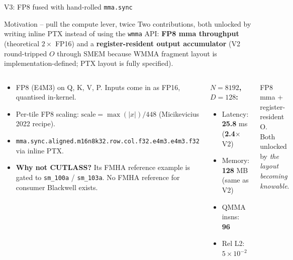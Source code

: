 \documentclass[10pt,aspectratio=169]{beamer}
\begin{document}
\begin{frame}{V3: FP8 fused with hand-rolled \texttt{mma.sync}}
  \begin{block}{Motivation -- pull the compute lever, twice}
    Two contributions, both unlocked by writing inline PTX instead of
    using the \texttt{wmma} API: \textbf{FP8 mma throughput} (theoretical
    $2\times$ FP16) and a \textbf{register-resident output accumulator}
    (V2 round-tripped $O$ through SMEM because WMMA fragment layout is
    implementation-defined; PTX layout is fully specified).
  \end{block}
  \begin{columns}[T]
      \begin{whatif}
        \begin{itemize}
          \item FP8 (E4M3) on Q, K, V, P. Inputs come in as FP16,
                quantised in-kernel.
          \item Per-tile FP8 scaling: $\mathrm{scale} = \max(|x|)/448$
                (Micikevicius 2022 recipe).
          \item \texttt{mma.sync.aligned.m16n8k32.row.col.f32.e4m3.e4m3.f32}
                via inline PTX.
          \item \textbf{Why not CUTLASS?} Its FMHA reference example is
                gated to \texttt{sm\_100a} / \texttt{sm\_103a}. No FMHA
                reference for consumer Blackwell exists.
        \end{itemize}
      \end{whatif}
      \begin{numbers}
        \textbf{$N = 8192$, $D = 128$:}
        \begin{itemize}
          \item Latency: \textbf{25.8} ms (\textbf{2.4$\times$} V2)
          \item Memory: \textbf{128} MB (same as V2)
          \item QMMA insns: \textbf{96}
          \item Rel L2: $5 \times 10^{-2}$
        \end{itemize}
      \end{numbers}
      \begin{aha}
        FP8 mma + register-resident O.\\
        Both unlocked by \emph{the layout becoming knowable}.
      \end{aha}
  \end{columns}
\end{frame}
\end{document}
